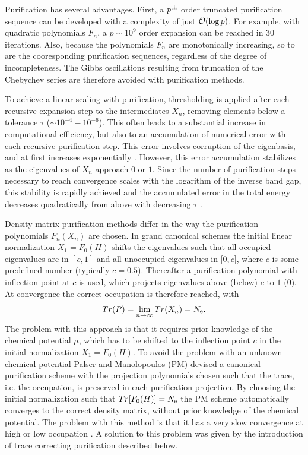 \documentclass[twocolumn,showpacs,preprintnumbers,amsmath,amssymb]{revtex4}
\begin{document}
Purification has several advantages.  First, 
a $p^{\rm th}$ order truncated purification sequence can be developed with a complexity of just ${\cal O}(\log p)$.   
For example, with quadratic polynomials $F_n$,  a $p \sim 10^9$ order expansion can be reached in 30 iterations.
Also, because the polynomials $F_n$ are  monotonically increasing, so to are the cooresponding purification 
sequences, regardless of the degree of incompleteness.  The Gibbs oscillations resulting from truncation of the 
Chebychev series are therefore avoided with purification methods.



To achieve a linear scaling with purification, thresholding is applied after each recursive 
expansion step to the intermediates $X_n$, removing elements below a tolerance $\tau$ ($\sim 10^{-4}-10^{-6}$). 
This often leads to a substantial increase in computational efficiency, but also
to an accumulation of numerical error with each recursive purification step.
This error involves corruption of the eigenbasis, and at first increases exponentially \cite{ANiklasson03}. 
However, this error accumulation stabilizes as the eigenvalues of $X_n$ approach 
$0$ or $1$. Since the number of purification steps necessary to reach convergence scales with the 
logarithm of the inverse band gap, this stability is rapidly achieved and the accumulated error 
in the total energy decreases quadratically from above with decreasing $\tau$ \cite{ANiklasson03}. 

Density matrix purification methods differ in the way the purification polynomials $F_n(X_n)$
are chosen. In grand canonical schemes \cite{APalser98,AHolas01,ANiklasson02A} the initial linear normalization
$X_1 = F_0(H)$ shifts the  eigenvalues such that all occupied eigenvalues are in $[c,1]$ and
all unoccupied eigenvalues in [$0,c]$, where $c$ is some predefined number (typically $c = 0.5$).
Thereafter a purification polynomial with inflection point at $c$ is used, which projects
eigenvalues above (below) $c$ to $1$ ($0$). At convergence the correct occupation is therefore reached, with
\begin{equation}
Tr(P) = \lim_{n \rightarrow \infty} Tr(X_n) = N_{\rm e}.
\end{equation}
The problem with this approach is that it requires prior knowledge of the 
chemical potential $\mu$, which has to be shifted to the inflection point $c$ in the initial
normalization $X_1 = F_0(H)$.
To avoid the problem with an unknown chemical potential Palser and Manolopoulos (PM) devised  a
canonical purification scheme \cite{APalser98} with the projection polynomials chosen
such that the trace, i.e. the occupation, is preserved in each purification projection.
By choosing the initial normalization such that $Tr[F_0(H)] = N_{\rm e}$ the PM scheme
automatically converges to the correct density matrix, without prior knowledge of 
the chemical potential.  The problem with this method is that it has a very slow
convergence  at high or low occupation \cite{APalser98,ANiklasson02A}.
A solution to this problem was given by the introduction of trace correcting purification 
\cite{ANiklasson02A} described below.
\end{document}

